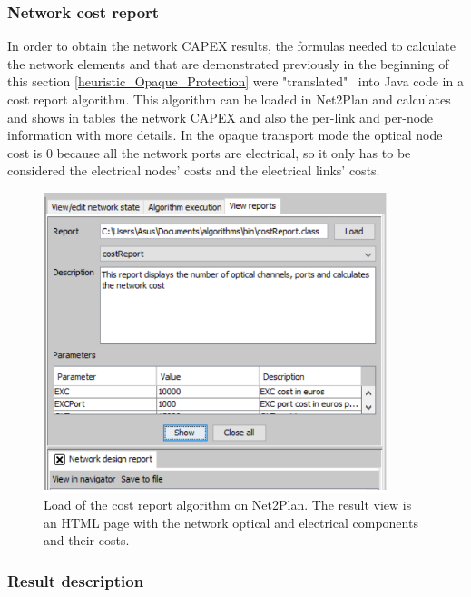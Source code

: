 \subsubsection{Network cost report}

\vspace{11pt}
In order to obtain the network CAPEX results, the formulas needed to calculate the network elements and that are demonstrated previously in the beginning of this section \ref{heuristic_Opaque_Protection} were "translated" \ into Java code in a cost report algorithm. This algorithm can be loaded in Net2Plan and calculates and shows in tables the network CAPEX and also the per-link and per-node information with more details.
In the opaque transport mode the optical node cost is 0 because all the network ports are electrical, so it only has to be considered the electrical nodes' costs and the electrical links' costs.

\begin{figure}[H]
\centering
\includegraphics[width=10cm]{sdf/heuristic/opaque_protection/figures/cost_report_opaque}
\caption{Load of the cost report algorithm on Net2Plan. The result view is an HTML page with the network optical and electrical components and their costs.}
\label{cost_report_opaque}
\end{figure}

\newpage
\subsubsection{Result description}\label{result_description_opaque_heuristic_protec}

